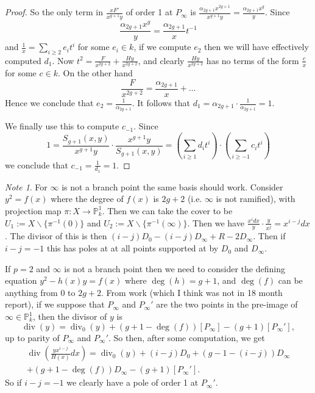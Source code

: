 \documentclass[draft, 11pt]{article} %
\theoremstyle{plain}
\theoremstyle{remark}
\newtheorem*{note}{Note}
\DeclareMathOperator{\di}{div}
\begin{document}
\begin{proof}
So the only term in $\frac{xF'}{x^{g+1}y}$ of order 1 at $P_\infty$ is $\frac{\alpha_{2g+1}x^{2g+1}}{x^{g+1}y} = \frac{\alpha_{2g+1}x^{g}}{y}$.
Since
\[
\frac{\alpha_{2g+1}x^g}{y} = \frac{\alpha_{2g+1}}{x}t^{-1}
\]
and $\frac{1}{x} = \sum_{i\geq 2}e_it^i$ for some $e_i \in k$, if we compute $e_2$ then we will have effectively computed $d_1$.
Now $t^2 = \frac{F }{x^{2g+2}}+ \frac{Hy}{x^{2g+2}}$, and clearly $\frac{Hy}{x^{2g+2}}$ has no terms of the form $\frac{c}{x}$ for some $c \in k$.
On the other hand
\[
\frac{F}{x^{2g+2}} = \frac{\alpha_{2g+1}}{x} + \ldots
\]
Hence we conclude that $e_2 = \frac{1}{\alpha_{2g+1}}$.
It follows that $d_1 = \alpha_{2g+1} \cdot \frac{1}{\alpha_{2g+1}} = 1$.


We finally use this to compute $c_{-1}$.
Since 
\begin{equation*}
1 = \frac{S_{g+1}(x,y)}{x^{g+1}y}\cdot \frac{x^{g+1}y}{S_{g+1}(x,y)} = \left( \sum_{i\geq 1}d_it^i \right) \cdot \left( \sum_{i\geq -1}c_it^i\right)
\end{equation*}
we conclude that $c_{-1} = \frac{1}{d_{1}} = 1$.




\end{proof}



\begin{comment}
We define $\alpha^i_j$ and $\Alpha^i_{j+1}$ for $0 \leq j \leq 2g$, and $B_k^i$ for $1\leq k \leq g$, such that
\[
$s_i(x) = \alpha^i_{2g}x^{2g} + \ldots + \alpha^i_0 \ {\rm and } \ S_i(x) = A_{2g+1}^ix^{2g+1} + \ldots + A^i_1 x + y(B_g^i x^i + \ldots + B_1^i x).
\]
\end{comment}


\begin{note}
For $\infty$ is not a branch point the same basis should work. 
Consider $y^2 = f(x)$ where the degree of $f(x)$ is $2g+2$ (i.e. $\infty$ is not ramified), with projection map $\pi : X \rightarrow \mathbb P_k^1$.
Then we can take the cover to be $U_1 := X \backslash \{\pi^{-1}(0)\}$ and $U_2 := X \backslash \{\pi^{-1}(\infty)\}$.
Then we have $\frac{x^idx}{y} \cdot \frac{y}{x^{j}} = x^{i-j}dx$.
The divisor of this is then $(i-j)D_0 -(i-j)D_\infty + R - 2D_\infty$.
Then if $i-j = -1$ this has poles at at all points supported at by $D_0$ and $D_\infty$.


If $p=2$ and $\infty$ is not a branch point then we need to consider the defining equation $y^2 - h(x)y = f(x)$ where $\deg(h)=g+1$, and $\deg(f)$ can be anything from 0 to $2g+2$.
From work (which I think was not in 18 month report), if we suppose that $P_\infty$ and $P_\infty'$ are the two points in the pre-image of $\infty \in \mathbb P_k^1$, then the divisor of $y$ is
\[
\di(y) = \di_0(y) +(g+1 - \deg(f))[P_\infty] - (g+1)[P_\infty'],
\]
up to parity of $P_\infty$ and $P_\infty'$.
So then, after some computation, we get
\begin{multline*}
\di\left(\frac{yx^{i-j}}{H(x)}dx \right) = \di_0(y) + (i-j)D_0 + (g-1-(i-j))D_\infty \\ + (g+1-\deg(f))D_\infty -(g+1)[P_\infty'].
\end{multline*}
So if $i-j = -1$ we clearly have a pole of order 1 at $P_\infty'$.
\end{note}
\end{document}

